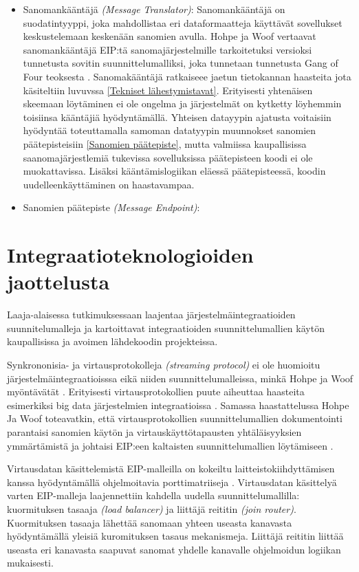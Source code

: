 \begin{itemize}
   \item Sanomankääntäjä \textit{(Message Translator)}:
      Sanomankääntäjä on suodatintyyppi, joka mahdollistaa eri dataformaatteja käyttävät sovellukset keskustelemaan keskenään sanomien avulla. Hohpe ja Woof vertaavat sanomankääntäjä EIP:tä sanomajärjestelmille tarkoitetuksi versioksi tunnetusta sovitin suunnittelumalliksi, joka \citep[sivu~97]{Hohpe2004} tunnetaan tunnetusta Gang of Four teoksesta \citep{Gamma1994}.
   Sanomakääntäjä ratkaiseee jaetun tietokannan haasteita jota käsiteltiin luvuvssa \ref{Tekniset lähestymistavat}. Erityisesti yhtenäisen skeemaan löytäminen ei ole ongelma ja järjestelmät on  kytketty löyhemmin toisiinsa kääntäjiä hyödyntämällä.
   Yhteisen datayypin ajatusta voitaisiin hyödyntää toteuttamalla samoman datatyypin muunnokset sanomien päätepisteisiin \ref{Sanomien päätepiste}, mutta valmiissa kaupallisissa saanomajärjestlemiä tukevissa sovelluksissa päätepisteen koodi ei ole muokattavissa. Lisäksi kääntämislogiikan eläessä päätepisteessä, koodin uudelleenkäyttäminen on haastavampaa.


\item Sanomien päätepiste \textit{(Message Endpoint)}\label{Sanomien päätepiste}:

\end{itemize}



\chapter{Integraatioteknologioiden jaottelusta}

Laaja-alaisessa tutkimuksessaan \citep{Ritter2017} laajentaa järjestelmäintegraatioiden suunnitelumalleja ja kartoittavat integraatioiden suunnittelumallien käytön kaupallisissa ja avoimen lähdekoodin projekteissa.

Synkrononisia- ja  virtausprotokolleja \textit{(streaming protocol)} ei  ole huomioitu järjestelmäintegraatioisssa eikä niiden suunnittelumalleissa, minkä Hohpe ja Woof myöntävätät \citep{Zimmermann2016}. Erityisesti virtausprotokollien puute aiheuttaa haasteita esimerkiksi big data järjestelmien integraatioissa \citep{Ritter2017}.
Samassa haastattelussa Hohpe Ja Woof toteavatkin, että virtausprotokollien suunnittelumallien dokumentointi parantaisi sanomien käytön ja virtauskäyttötapausten yhtäläisyyksien ymmärtämistä ja johtaisi EIP:een kaltaisten suunnittelumallien löytämiseen \citep{Ritter2017}.

Virtausdatan käsittelemistä EIP-malleilla on kokeiltu laitteistokiihdyttämisen kanssa hyödyntämällä ohjelmoitavia porttimatriiseja \citep{DannRitter2017}. Virtausdatan käsittelyä varten EIP-malleja laajennettiin kahdella uudella suunnittelumallilla: kuormituksen tasaaja \textit{(load balancer)} ja liittäjä reititin \textit{(join router)}. Kuormituksen tasaaja lähettää sanomaan yhteen useasta kanavasta hyödyntämällä yleisiä kuromituksen tasaus mekanismeja. Liittäjä reititin liittää useasta eri kanavasta saapuvat sanomat yhdelle kanavalle ohjelmoidun logiikan mukaisesti.


